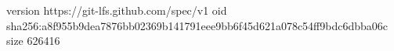 version https://git-lfs.github.com/spec/v1
oid sha256:a8f955b9dea7876bb02369b141791eee9bb6f45d621a078c54ff9bdc6dbba06c
size 626416

